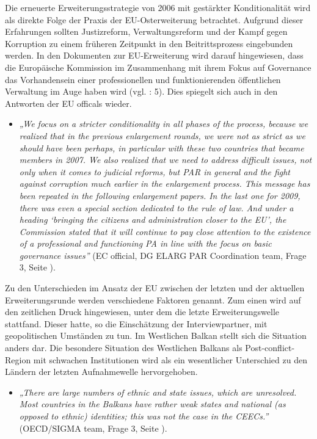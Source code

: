 Die erneuerte Erweiterungsstrategie von 2006 mit gestärkter Konditionalität wird als direkte Folge der Praxis der EU-Osterweiterung betrachtet. Aufgrund dieser Erfahrungen sollten Justizreform, Verwaltungsreform und der Kampf gegen Korruption zu einem früheren Zeitpunkt in den Beitrittsprozess eingebunden werden. In den Dokumenten zur EU-Erweiterung wird darauf hingewiesen, dass die Europäische Kommission im Zusammenhang mit ihrem Fokus auf Governance das Vorhandensein einer professionellen und funktionierenden öffentlichen Verwaltung im Auge haben wird (vgl. \cite{eurcom06c} : 5). Dies spiegelt sich auch in den Antworten der EU officals wieder.
\begin{itemize}[label={}]
\item \textit{„We focus on a stricter conditionality in all phases of the process, because we realized that in the previous enlargement rounds, we were not as strict as we should have been perhaps, in particular with these two countries that became members in 2007. We also realized that we need to address difficult issues, not only when it comes to judicial reforms, but PAR in general and the fight against corruption much earlier in the enlargement process. This message has been repeated in the following enlargement papers. In the last one for 2009, there was even a special section dedicated to the rule of law. And under a heading ‘bringing the citizens and administration closer to the EU’, the Commission stated that it will continue to pay close attention to the existence of a professional and functioning PA in line with the focus on basic governance issues”} (EC official, DG ELARG PAR Coordination team, Frage 3, Seite \pageref{sec:enlargement}).
\end{itemize}
Zu den Unterschieden im Ansatz der EU zwischen der letzten und der aktuellen Erweiterungsrunde werden verschiedene Faktoren genannt. Zum einen wird auf den zeitlichen Druck hingewiesen, unter dem die letzte Erweiterungswelle stattfand. Dieser hatte, so die Einschätzung der Interviewpartner, mit geopolitischen Umständen zu tun. Im Westlichen Balkan stellt sich die Situation anders dar. Die besondere Situation des Westlichen Balkans als Post-conflict-Region mit schwachen Institutionen wird als ein wesentlicher Unterschied zu den Ländern der letzten Aufnahmewelle hervorgehoben.
\begin{itemize}[label={}]
\item \textit{„There are large numbers of ethnic and state issues, which are unresolved. Most countries in the Balkans have rather weak states and national (as opposed to ethnic) identities; this was not the case in the CEECs.”} (OECD/SIGMA team, Frage 3, Seite \pageref{sec:enlargement}).
\end{itemize}
